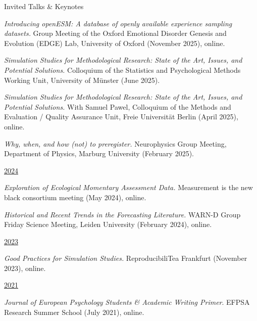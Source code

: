 \documentclass{resume} %
\begin{document}
\begin{rSection}{Invited Talks \& Keynotes}
\begin{etaremune}
\item \textit{Introducing openESM: A database of openly available experience sampling datasets.} Group Meeting of the Oxford Emotional Disorder Genesis and Evolution (EDGE) Lab, University of Oxford (November 2025), online. 

\item \textit{Simulation Studies for Methodological Research: State of the Art, Issues, and Potential Solutions.} Colloquium of the Statistics and Psychological Methods Working Unit, University of Münster (June 2025).

\item \textit{Simulation Studies for Methodological Research: State of the Art, Issues, and Potential Solutions.} With Samuel Pawel, Colloquium of the Methods and Evaluation / Quality Assurance Unit, Freie Universität Berlin (April 2025), online.

\item \textit{Why, when, and how (not) to preregister.} Neurophysics Group Meeting, Department of Physics, Marburg University (February 2025).

\hspace{-0.75cm}\underline{2024}
\item \textit{Exploration of Ecological Momentary Assessment Data.} Measurement is the new black consortium meeting (May 2024), online.

\item \textit{Historical and Recent Trends in the Forecasting Literature.} WARN-D Group Friday Science Meeting, Leiden University (February 2024), online.


\hspace{-0.75cm}\underline{2023}
 \item \textit{Good Practices for Simulation Studies.} ReproducibiliTea Frankfurt (November 2023), online.    

\hspace{-0.75cm}\underline{2021}
    \item \textit{Journal of European Psychology Students \& Academic Writing Primer}. EFPSA Research Summer School (July 2021), online.
\end{etaremune}

\end{rSection}
\end{document}
